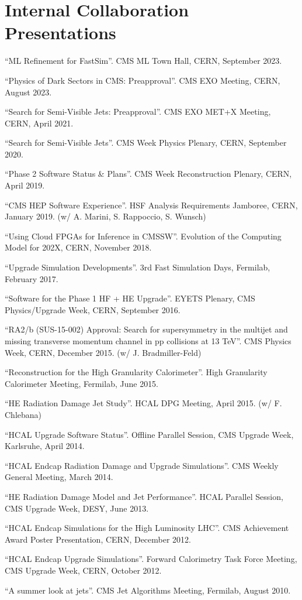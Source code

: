 \section{Internal Collaboration Presentations}
\begin{description}[leftmargin=12pt,font=\normalfont,labelsep=0em]
\item ``ML Refinement for FastSim''. CMS ML Town Hall, CERN, September 2023.
\item ``Physics of Dark Sectors in CMS: Preapproval''. CMS EXO Meeting, CERN, August 2023.
\item ``Search for Semi-Visible Jets: Preapproval''. CMS EXO MET+X Meeting, CERN, April 2021.
\item ``Search for Semi-Visible Jets''. CMS Week Physics Plenary, CERN, September 2020.
\item ``Phase 2 Software Status \& Plans''. CMS Week Reconstruction Plenary, CERN, April 2019.
\item ``CMS HEP Software Experience''. HSF Analysis Requirements Jamboree, CERN, January 2019. (w/ A. Marini, S. Rappoccio, S. Wunsch)
\item ``Using Cloud FPGAs for Inference in CMSSW''. Evolution of the Computing Model for 202X, CERN, November 2018.
\item ``Upgrade Simulation Developments''. 3rd Fast Simulation Days, Fermilab, February 2017.
\item ``Software for the Phase 1 HF + HE Upgrade''. EYETS Plenary, CMS Physics/Upgrade Week, CERN, September 2016.
\item ``RA2/b (SUS-15-002) Approval: Search for supersymmetry in the multijet and missing transverse momentum channel in pp collisions at 13 TeV''. CMS Physics Week, CERN, December 2015. (w/ J. Bradmiller-Feld)
\item ``Reconstruction for the High Granularity Calorimeter''. High Granularity Calorimeter Meeting, Fermilab, June 2015.
\item ``HE Radiation Damage Jet Study''. HCAL DPG Meeting, April 2015. (w/ F. Chlebana)
\item ``HCAL Upgrade Software Status''. Offline Parallel Session, CMS Upgrade Week, Karlsruhe, April 2014.
\item ``HCAL Endcap Radiation Damage and Upgrade Simulations''. CMS Weekly General Meeting, March 2014.
\item ``HE Radiation Damage Model and Jet Performance''. HCAL Parallel Session, CMS Upgrade Week, DESY, June 2013.
\item ``HCAL Endcap Simulations for the High Luminosity LHC''. CMS Achievement Award Poster Presentation, CERN, December 2012.
\item ``HCAL Endcap Upgrade Simulations''. Forward Calorimetry Task Force Meeting, CMS Upgrade Week, CERN, October 2012.
\item ``A summer look at jets''. CMS Jet Algorithms Meeting, Fermilab, August 2010.
\end{description}
\fi
